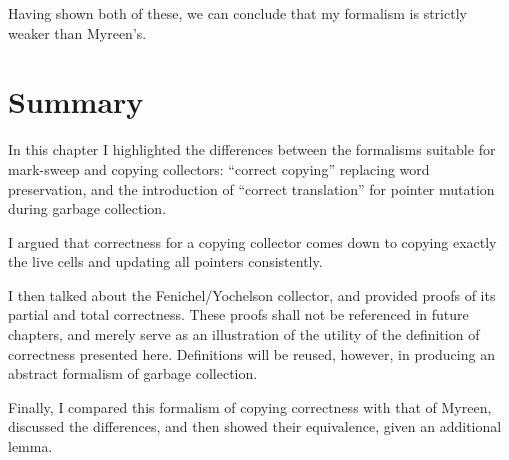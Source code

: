 Having shown both of these, we can conclude that my formalism is
strictly weaker than Myreen's.

\section{Summary}
\label{sec:copying-summary}

In this chapter I highlighted the differences between the formalisms
suitable for \gls{mark-sweep} and \gls{copying} \glspl{collector}:
``correct copying'' replacing word preservation, and the introduction
of ``correct translation'' for \gls{pointer} mutation during
\gls{garbage collection}.

I argued that correctness for a \gls{copying} \gls{collector} comes
down to copying exactly the \glspl{live cell} and updating all
\glspl{pointer} consistently.

I then talked about the Fenichel/Yochelson\cite{Fenichel69} collector,
and provided proofs of its partial and total correctness. These proofs
shall not be referenced in future chapters, and merely serve as an
illustration of the utility of the definition of correctness presented
here. Definitions will be reused, however, in producing an abstract
formalism of garbage collection.

Finally, I compared this formalism of copying correctness with that of
Myreen\cite{Myreen10}, discussed the differences, and then showed
their equivalence, given an additional lemma.
